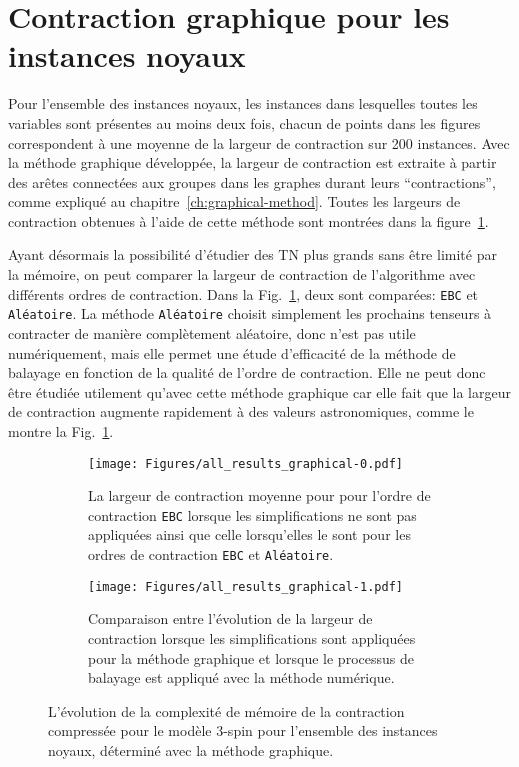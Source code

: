 \section{Contraction graphique pour les instances noyaux}\label{sec:results-only_cores}
Pour l'ensemble des instances noyaux, les instances dans lesquelles toutes les variables sont présentes au moins deux fois, chacun de points dans les figures correspondent à une moyenne de la largeur de contraction sur 200 instances.
Avec la méthode graphique développée, la largeur de contraction est extraite à partir des arêtes connectées aux groupes dans les graphes durant leurs ``contractions'', comme expliqué au chapitre~\ref{ch:graphical-method}.
Toutes les largeurs de contraction obtenues à l'aide de cette méthode sont montrées dans la figure~\ref{subfig:all-results-graphical-a}.

Ayant désormais la possibilité d'étudier des TN plus grands sans être limité par la mémoire, on peut comparer la largeur de contraction de l'algorithme avec différents ordres de contraction.
Dans la Fig.~\ref{subfig:all-results-graphical-a}, deux sont comparées: \verb|EBC| et \verb|Aléatoire|.
La méthode \verb|Aléatoire| choisit simplement les prochains tenseurs à contracter de manière complètement aléatoire, donc n'est pas utile numériquement, mais elle permet une étude d'efficacité de la méthode de balayage en fonction de la qualité de l'ordre de contraction.
Elle ne peut donc être étudiée utilement qu'avec cette méthode graphique car elle fait que la largeur de contraction augmente rapidement à des valeurs astronomiques, comme le montre la Fig.~\ref{subfig:all-results-graphical-a}.
\begin{figure}[h]
    \centering
    \begin{subfigure}{.49\textwidth}
        \centering
        \texttt{[image: Figures/all\_results\_graphical-0.pdf]}
        \caption{La largeur de contraction moyenne pour pour l'ordre de contraction \texttt{EBC} lorsque les simplifications ne sont pas appliquées ainsi que celle lorsqu'elles le sont pour les ordres de contraction \texttt{EBC} et \texttt{Aléatoire}.}
        \label{subfig:all-results-graphical-a}
    \end{subfigure}
    \hfill
    \begin{subfigure}{.49\textwidth}
        \centering
        \texttt{[image: Figures/all\_results\_graphical-1.pdf]}
        \caption{Comparaison entre l'évolution de la largeur de contraction lorsque les simplifications sont appliquées pour la méthode graphique et lorsque le processus de balayage est appliqué avec la méthode numérique.}
        \label{subfig:all-results-graphical-b}
    \end{subfigure}
    \caption{L'évolution de la complexité de mémoire de la contraction compressée pour le modèle $3$-spin pour l'ensemble des instances noyaux, déterminé avec la méthode graphique.}
    \label{fig:all-results-graphical}
\end{figure}

